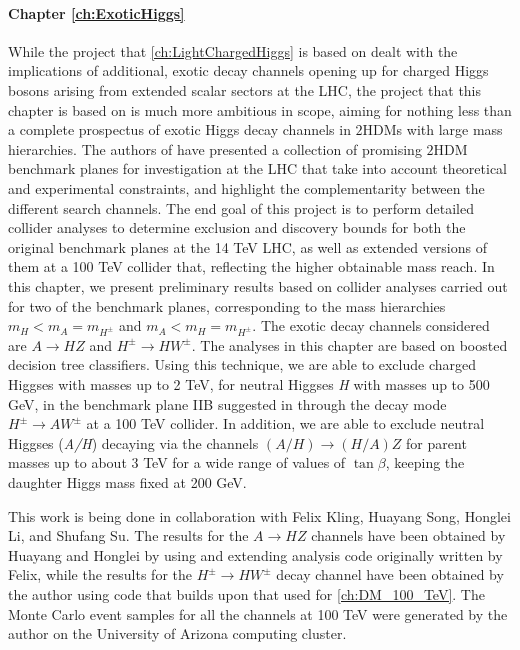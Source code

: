 \paragraph{Chapter \ref{ch:ExoticHiggs}}
While the project that \autoref{ch:LightChargedHiggs} is based on dealt with the implications of additional, exotic decay channels opening up for charged Higgs bosons arising from extended scalar sectors at the LHC, the project that this chapter is based on is much more ambitious in scope, aiming for nothing less than a complete prospectus of exotic Higgs decay channels in $2$HDMs with large mass hierarchies. The authors of \citep{Kling2016} have presented a collection of promising $2$HDM benchmark planes for investigation at the LHC that take into account theoretical and experimental constraints, and highlight the complementarity between the different search channels. The end goal of this project is to perform detailed collider analyses to determine exclusion and discovery bounds for both the original benchmark planes at the 14 TeV LHC, as well as extended versions of them at a 100 TeV collider that, reflecting the higher obtainable mass reach. In this chapter, we present preliminary results based on collider analyses carried out for two of the benchmark planes, corresponding to the mass hierarchies $m_H < m_A = m_{H^\pm}$ and $m_A < m_H = m_{H^\pm}$. The exotic decay channels considered are $A\rightarrow HZ$ and $H^\pm\rightarrow HW^\pm$. The analyses in this chapter are based on boosted decision tree classifiers. Using this technique, we are able to exclude charged Higgses with masses up to 2 TeV, for neutral Higgses \emph{H} with masses up to 500 GeV, in the benchmark plane IIB suggested in \cite{Kling2016} through the decay mode $H^\pm\rightarrow AW^\pm$ at a 100 TeV collider. In addition, we are able to exclude neutral Higgses (\emph{A/H}) decaying via the channels $(A/H)\rightarrow (H/A)Z$ for parent masses up to about 3 TeV for a wide range of values of $\tan\beta$, keeping the daughter Higgs mass fixed at 200 GeV.

This work is being done in collaboration with Felix Kling, Huayang Song, Honglei Li, and Shufang Su. The results for the $A\rightarrow HZ$ channels have been obtained by Huayang and Honglei by using and extending analysis code originally written by Felix, while the results for the $H^\pm\rightarrow HW^\pm$ decay channel have been obtained by the author using code that builds upon that used for \autoref{ch:DM_100_TeV}. The Monte Carlo event samples for all the channels at 100 TeV were generated by the author on the University of Arizona computing cluster.

